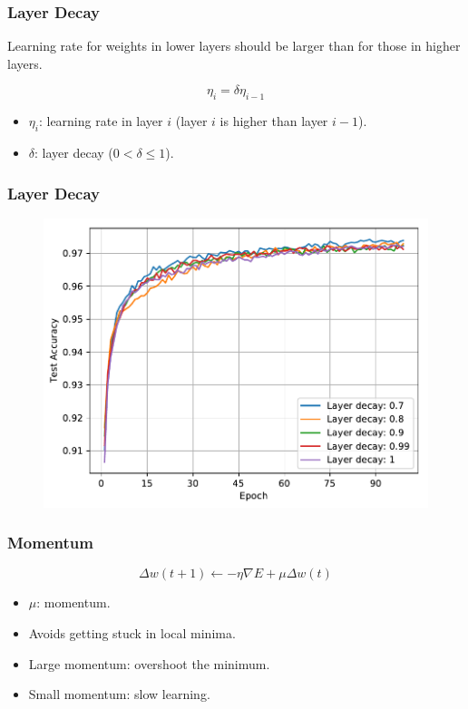\documentclass[pdf]{beamer}
\begin{document}
\begin{frame}
\frametitle{Layer Decay}

Learning rate for weights in lower layers should be larger than for those in higher layers.

\begin{equation}
  \eta_i = \delta \eta_{i-1}
\end{equation}

\begin{itemize}
\item $\eta_i$: learning rate in layer $i$ (layer $i$ is higher than layer $i-1$).
\item $\delta$: layer decay ($0 < \delta \leq 1$).
\end{itemize}

\end{frame}

\begin{frame}
\frametitle{Layer Decay}
\begin{figure}[!htb]
  \includegraphics[height=0.8\textheight]{plots/layer_decay_zoom.pdf}
\end{figure}
\end{frame}

\begin{frame}
\frametitle{Momentum}
\begin{equation}
  \Delta w(t + 1) \leftarrow - \eta \nabla E + \mu \Delta w(t)
\end{equation}
\begin{itemize}
  \item $\mu$: momentum.
  \item Avoids getting stuck in local minima.
  \item Large momentum: overshoot the minimum.
  \item Small momentum: slow learning.
\end{itemize}
\end{frame}
\end{document}
